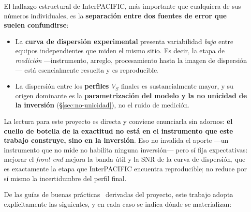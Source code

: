El hallazgo estructural de InterPACIFIC, m\'as importante que cualquiera de sus n\'umeros
individuales, es la \textbf{separaci\'on entre dos fuentes de error que suelen confundirse}:

\begin{itemize}[itemsep=0.2em]
    \item La \textbf{curva de dispersi\'on experimental} presenta variabilidad
    \emph{baja} entre equipos independientes que miden el mismo sitio. Es decir, la etapa
    de \emph{medici\'on} ---instrumento, arreglo, procesamiento hasta la imagen de
    dispersi\'on--- est\'a esencialmente resuelta y es reproducible.
    \item La dispersi\'on entre los \textbf{perfiles $V_S$} finales es sustancialmente
    mayor, y su origen dominante es la \textbf{parametrizaci\'on del modelo y la no
    unicidad de la inversi\'on} (\S\ref{sec:no-unicidad}), no el ruido de medici\'on.
\end{itemize}

La lectura para este proyecto es directa y conviene enunciarla sin adornos: \textbf{el
cuello de botella de la exactitud no est\'a en el instrumento que este trabajo construye,
sino en la inversi\'on}. Eso no invalida el aporte ---un instrumento que no mide no habilita
ninguna inversi\'on--- pero s\'i fija expectativas: mejorar el \emph{front-end} mejora la
banda \'util y la SNR de la curva de dispersi\'on, que es exactamente la etapa que
InterPACIFIC encuentra reproducible; no reduce por s\'i mismo la incertidumbre del perfil
final.

De las gu\'ias de buenas pr\'acticas~\cite{Foti2018} derivadas del proyecto, este trabajo
adopta expl\'icitamente las siguientes, y en cada caso se indica d\'onde se materializan:

